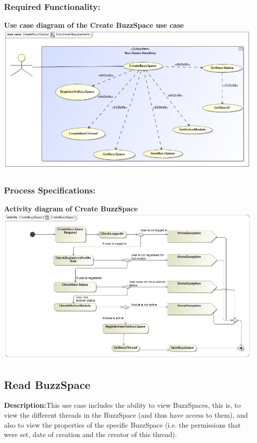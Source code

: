 \documentclass[a4paper,11pt]{article}
\begin{document}
\subsubsection{Required Functionality:} 
\textbf{Use case diagram of the Create BuzzSpace use case}\\ 
\includegraphics[width=1\linewidth]{./Images/BuzzSpaceHandling/buzzSpaceCreation.jpg}\\
\subsubsection{Process Specifications:} 
\textbf{Activity diagram of Create BuzzSpace}\\ 
\includegraphics[width=1\linewidth]{./Images/BuzzSpaceHandling/buzzSpaceCreationAct.jpg}\\

\subsection{Read BuzzSpace}
\textbf{Description:}This use case includes the ability to view BuzzSpaces, this is, to view the different threads in the BuzzSpace (and thus have access to them), and also to view the
properties of the specific BuzzSpace (i.e. the permissions that were set, date of creation and the creator of this thread).
\end{document}
